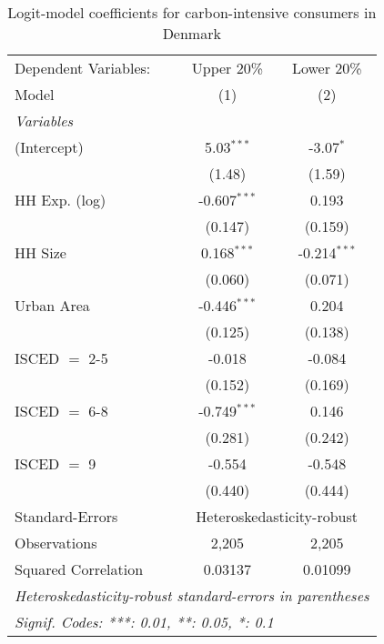 
\begin{table}[htbp!]
   \centering
   \small
   \begin{adjustbox}{width = 1\textwidth, max height = 0.95\textheight, center}
      \begin{threeparttable}[b]
         \caption{\label{tab:Logit_1_DNK} Logit-model coefficients for carbon-intensive consumers in Denmark}
         \begin{tabular}{lcc}
            \tabularnewline \midrule \midrule
            Dependent Variables: & Upper 20\%     & Lower 20\%\\   
            Model                & (1)            & (2)\\  
            \midrule
            \emph{Variables}\\
            (Intercept)          & 5.03$^{***}$   & -3.07$^{*}$\\   
                                 & (1.48)         & (1.59)\\   
            HH Exp. (log)        & -0.607$^{***}$ & 0.193\\   
                                 & (0.147)        & (0.159)\\   
            HH Size              & 0.168$^{***}$  & -0.214$^{***}$\\   
                                 & (0.060)        & (0.071)\\   
            Urban Area           & -0.446$^{***}$ & 0.204\\   
                                 & (0.125)        & (0.138)\\   
            ISCED $=$ 2-5        & -0.018         & -0.084\\   
                                 & (0.152)        & (0.169)\\   
            ISCED $=$ 6-8        & -0.749$^{***}$ & 0.146\\   
                                 & (0.281)        & (0.242)\\   
            ISCED $=$ 9          & -0.554         & -0.548\\   
                                 & (0.440)        & (0.444)\\   
            \midrule 
            Standard-Errors & \multicolumn{2}{c}{Heteroskedasticity-robust} \\ 
            Observations         & 2,205          & 2,205\\  
            Squared Correlation  & 0.03137        & 0.01099\\  
            \midrule \midrule
            \multicolumn{3}{l}{\emph{Heteroskedasticity-robust standard-errors in parentheses}}\\
            \multicolumn{3}{l}{\emph{Signif. Codes: ***: 0.01, **: 0.05, *: 0.1}}\\
         \end{tabular}
         

\end{threeparttable}
\end{adjustbox}
\end{table}

